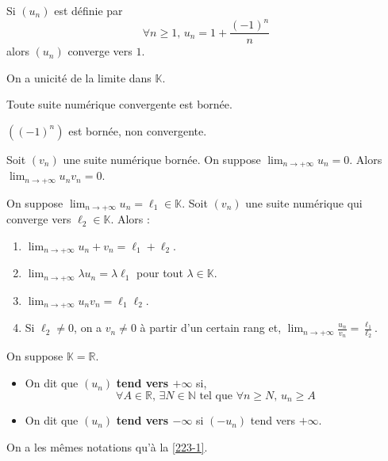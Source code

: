   \begin{example}
    Si $(u_n)$ est définie par
    \[ \forall n \geq 1, \, u_n = 1 + \frac{(-1)^n}{n} \]
    alors $(u_n)$ converge vers $1$.
  \end{example}

  \begin{theorem}
    On a unicité de la limite dans $\mathbb{K}$.
  \end{theorem}

  \begin{proposition}
    Toute suite numérique convergente est bornée.
  \end{proposition}

  \begin{cexample}
    $((-1)^n)$ est bornée, non convergente.
  \end{cexample}

  \begin{proposition}
    Soit $(v_n)$ une suite numérique bornée. On suppose $\lim_{n \rightarrow +\infty} u_n = 0$. Alors $\lim_{n \rightarrow +\infty} u_n v_n = 0$.
  \end{proposition}

  \begin{proposition}
    On suppose $\lim_{n \rightarrow +\infty} u_n = \ell_1 \in \mathbb{K}$. Soit $(v_n)$ une suite numérique qui converge vers $\ell_2 \in \mathbb{K}$. Alors :
    \begin{enumerate}[label={\bfseries(\roman*)}]
      \item $\lim_{n \rightarrow +\infty} u_n + v_n = \ell_1 + \ell_2$.
      \item $\lim_{n \rightarrow +\infty} \lambda u_n = \lambda \ell_1$ pour tout $\lambda \in \mathbb{K}$.
      \item $\lim_{n \rightarrow +\infty} u_n v_n = \ell_1 \ell_2$.
      \item Si $\ell_2 \neq 0$, on a $v_n \neq 0$ à partir d'un certain rang et, $\lim_{n \rightarrow +\infty} \frac{u_n}{v_n} = \frac{\ell_1}{\ell_2}$.
    \end{enumerate}
  \end{proposition}


  \begin{definition}
    On suppose $\mathbb{K} = \mathbb{R}$.
    \begin{itemize}
      \item On dit que $(u_n)$ \textbf{tend vers $+\infty$} si,
      \[ \forall A \in \mathbb{R}, \, \exists N \in \mathbb{N} \text{ tel que } \forall n \geq N, \, u_n \geq A \]
      \item On dit que $(u_n)$ \textbf{tend vers $-\infty$} si $(-u_n)$ tend vers $+\infty$.
    \end{itemize}
    On a les mêmes notations qu'à la \cref{223-1}.
  \end{definition}

